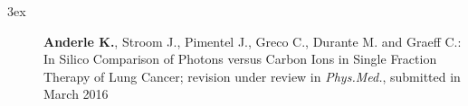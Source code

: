 \begin{setlength}{\leftmargini}{3ex}
 \begin{description}
 \item[] \textbf{Anderle K.}, Stroom J., Pimentel J., Greco C., Durante M. and Graeff C.: In Silico Comparison of Photons versus Carbon Ions in Single Fraction Therapy of Lung Cancer; revision under review in \textit{Phys.Med.}, submitted in March 2016 
 \end{description}
\end{setlength}

